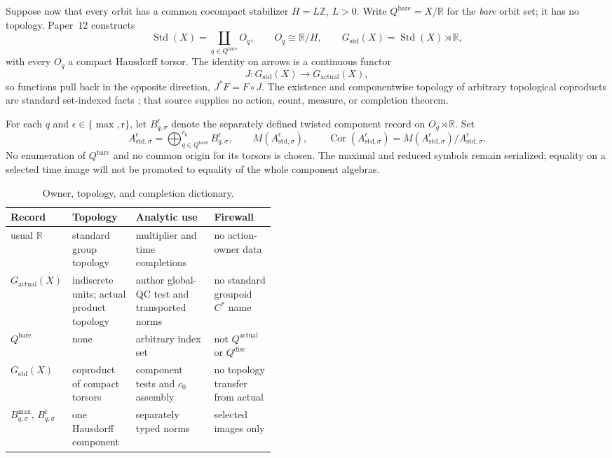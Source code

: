 \documentclass[11pt]{article}
\theoremstyle{definition}
\newcommand{\R}{\mathbb R}
\newcommand{\Z}{\mathbb Z}
\newcommand{\Gactual}{G_{\mathrm{actual}}}
\newcommand{\Gstd}{G_{\mathrm{std}}}
\newcommand{\Qbare}{Q^{\mathrm{bare}}}
\newcommand{\Std}{\operatorname{Std}}
\newcommand{\Cor}{\operatorname{Cor}}
\begin{document}
Suppose now that every orbit has a common cocompact stabilizer
$H=L\Z$, $L>0$.  Write $\Qbare=X/\R$ for the \emph{bare} orbit set; it has
no topology.  Paper~12 constructs
\[
 \Std(X)=\coprod_{q\in\Qbare}O_q,
 \qquad O_q\cong \R/H,
 \qquad \Gstd(X)=\Std(X)\rtimes\R,
\]
with every $O_q$ a compact Hausdorff torsor.  The identity on arrows is a
continuous functor
\[
 J:\Gstd(X)\longrightarrow\Gactual(X),
\]
so functions pull back in the opposite direction, $J^*F=F\circ J$.  The
existence and componentwise topology of arbitrary topological coproducts are
standard set-indexed facts \citep[Section 5.29 and Lemma
5.29.1]{Stacks0B1W}; that source supplies no action, count, measure, or
completion theorem.

For each $q$ and $\epsilon\in\{\max,\mathrm r\}$, let
$B_{q,\sigma}^{\epsilon}$ denote the separately defined twisted component
record on $O_q\rtimes\R$.  Set
\[
 A_{\mathrm{std},\sigma}^{\epsilon}
   =\bigoplus_{q\in\Qbare}^{c_0}B_{q,\sigma}^{\epsilon},
 \qquad
 M(A_{\mathrm{std},\sigma}^{\epsilon}),
 \qquad
 \Cor(A_{\mathrm{std},\sigma}^{\epsilon})
   =M(A_{\mathrm{std},\sigma}^{\epsilon})/
      A_{\mathrm{std},\sigma}^{\epsilon}.
\]
No enumeration of $\Qbare$ and no common origin for its torsors is chosen.
The maximal and reduced symbols remain serialized; equality on a selected
time image will not be promoted to equality of the whole component
algebras.

\begin{table}[t]
\centering
\caption{Owner, topology, and completion dictionary.}
\label{tab:owner-dictionary}
\small
\begin{tabularx}{\linewidth}{P{0.20\linewidth}P{0.24\linewidth}YY}
\toprule
Record & Topology & Analytic use & Firewall \\
\midrule
usual $\R$ & standard group topology & multiplier and time completions & no action-owner data \\
$\Gactual(X)$ & indiscrete units; actual product topology & author global-QC test and transported norms & no standard groupoid $C^*$ name \\
$\Qbare$ & none & arbitrary index set & not $Q^{\mathrm{actual}}$ or $Q^{\mathrm{disc}}$ \\
$\Gstd(X)$ & coproduct of compact torsors & component tests and $c_0$ assembly & no topology transfer from actual \\
$B_{q,\sigma}^{\max}$, $B_{q,\sigma}^{\mathrm r}$ & one Hausdorff component & separately typed norms & selected images only \\
\bottomrule
\end{tabularx}
\end{table}
\end{document}
